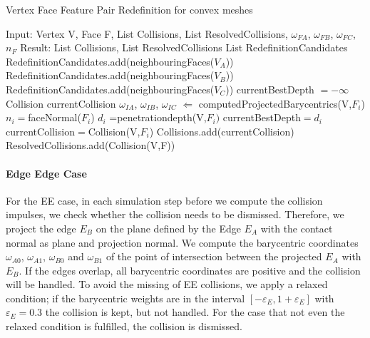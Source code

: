 \begin{algorithm}                    %
\caption{Vertex Face Feature Pair Redefinition for convex meshes}          %
\label{alg::VertexFaceFeaturePairRedefinition}                           %
\begin{algorithmic}[1]                    %
    \STATE Input: Vertex V, Face F, List Collisions, List ResolvedCollisions,  $\omega_{FA}$, $\omega_{FB}$, $\omega_{FC}$, $n_F$
    \STATE Result:  List Collisions, List ResolvedCollisions
    	\STATE List RedefinitionCandidates
           	\STATE RedefinitionCandidates.add(neighbouringFaces($V_A$))
        \ENDIF
          	\STATE RedefinitionCandidates.add(neighbouringFaces($V_B$))    
        \ENDIF
	        \STATE RedefinitionCandidates.add(neighbouringFaces($V_C$)) 
       	\ENDIF
       	\STATE currentBestDepth $=-\infty$ 
       	\STATE Collision currentCollision
       	 	\STATE $\omega_{IA}$, $\omega_{IB}$, $\omega_{IC}$ $ \Leftarrow$ computedProjectedBarycentrics(V,$F_i$)       	  	
     	       	\STATE $n_i =$faceNormal($F_i$) 
     	    	\STATE $d_i$ =penetrationdepth(V,$F_i)$
					\STATE currentBestDepth$=d_i$
					\STATE currentCollision$=$Collision(V,$F_i$)				
							  		\ENDIF 			
							  				  		\ENDIF 
	     	\ENDIF
        \ENDFOR
	     	\STATE Collisions.add(currentCollision)
	     	\STATE ResolvedCollisions.add(Collision(V,F))
     	\ENDIF
\end{algorithmic}
\end{algorithm}


\paragraph{Edge Edge Case} For the EE case, in each simulation step before we compute the collision impulses, we check whether the collision needs to be dismissed. Therefore, we project the edge $E_B$ on the plane defined by the Edge $E_A$ with the contact normal as plane and projection normal. We compute the barycentric coordinates $\omega_{A0}$, $\omega_{A1}$, $\omega_{B0}$ and $\omega_{B1}$  of the point of intersection between the projected $E_A$ with $E_B$.
If the edges overlap, all barycentric coordinates are positive and the collision will be handled.
To avoid the missing of EE collisions, we apply a relaxed condition; if the barycentric weights are in the interval $[-\varepsilon_E,1+\varepsilon_E]$ with $\varepsilon_E=0.3$ the collision is kept, but not handled. For the case that not even the relaxed condition is fulfilled, the collision is dismissed.

